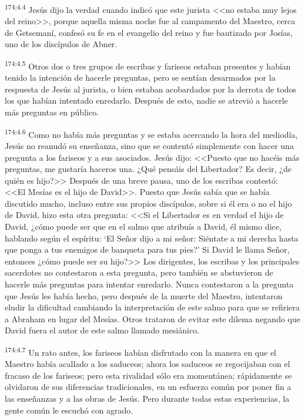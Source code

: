 \par 
\textsuperscript{174:4.4} Jesús dijo la verdad cuando indicó que este jurista <<no estaba muy lejos del reino>>, porque aquella misma noche fue al campamento del Maestro, cerca de Getsemaní, confesó su fe en el evangelio del reino y fue bautizado por Josías, uno de los discípulos de Abner.

\par 
\textsuperscript{174:4.5} Otros dos o tres grupos de escribas y fariseos estaban presentes y habían tenido la intención de hacerle preguntas, pero se sentían desarmados por la respuesta de Jesús al jurista, o bien estaban acobardados por la derrota de todos los que habían intentado enredarlo. Después de esto, nadie se atrevió a hacerle más preguntas en público.

\par 
\textsuperscript{174:4.6} Como no había más preguntas y se estaba acercando la hora del mediodía, Jesús no reanudó su enseñanza, sino que se contentó simplemente con hacer una pregunta a los fariseos y a sus asociados. Jesús dijo: <<Puesto que no hacéis más preguntas, me gustaría haceros una. ¿Qué pensáis del Libertador? Es decir, ¿de quién es hijo?>> Después de una breve pausa, uno de los escribas contestó: <<El Mesías es el hijo de David>>. Puesto que Jesús sabía que se había discutido mucho, incluso entre sus propios discípulos, sobre si él era o no el hijo de David, hizo esta otra pregunta: <<Si el Libertador es en verdad el hijo de David, ¿cómo puede ser que en el salmo que atribuís a David, él mismo dice, hablando según el espíritu: `El Señor dijo a mi señor: Siéntate a mi derecha hasta que ponga a tus enemigos de banqueta para tus pies?' Si David le llama Señor, entonces ¿cómo puede ser su hijo?>> Los dirigentes, los escribas y los principales sacerdotes no contestaron a esta pregunta, pero también se abstuvieron de hacerle más preguntas para intentar enredarlo. Nunca contestaron a la pregunta que Jesús les había hecho, pero después de la muerte del Maestro, intentaron eludir la dificultad cambiando la interpretación de este salmo para que se refiriera a Abraham en lugar del Mesías. Otros trataron de evitar este dilema negando que David fuera el autor de este salmo llamado mesiánico.

\par 
\textsuperscript{174:4.7} Un rato antes, los fariseos habían disfrutado con la manera en que el Maestro había acallado a los saduceos; ahora los saduceos se regocijaban con el fracaso de los fariseos; pero esta rivalidad sólo era momentánea; rápidamente se olvidaron de sus diferencias tradicionales, en un esfuerzo común por poner fin a las enseñanzas y a las obras de Jesús. Pero durante todas estas experiencias, la gente común le escuchó con agrado.

